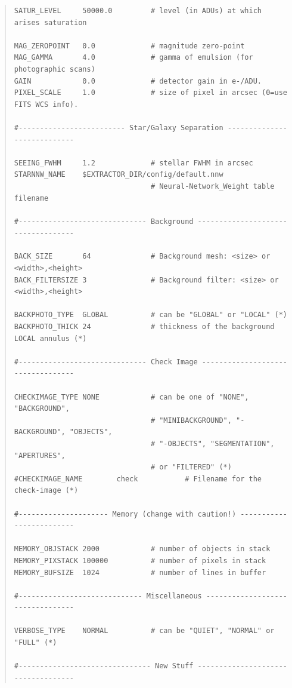 \documentclass[twoside,11pt]{article}
\renewcommand{\_}{\texttt{\symbol{95}}}
\begin{document}
\begin{quote}
\begin{verbatim}
SATUR_LEVEL     50000.0         # level (in ADUs) at which arises saturation

MAG_ZEROPOINT   0.0             # magnitude zero-point
MAG_GAMMA       4.0             # gamma of emulsion (for photographic scans)
GAIN            0.0             # detector gain in e-/ADU.
PIXEL_SCALE     1.0             # size of pixel in arcsec (0=use FITS WCS info).

#------------------------- Star/Galaxy Separation ----------------------------

SEEING_FWHM     1.2             # stellar FWHM in arcsec
STARNNW_NAME    $EXTRACTOR_DIR/config/default.nnw
                                # Neural-Network_Weight table filename

#------------------------------ Background -----------------------------------

BACK_SIZE       64              # Background mesh: <size> or <width>,<height>
BACK_FILTERSIZE 3               # Background filter: <size> or <width>,<height>

BACKPHOTO_TYPE  GLOBAL          # can be "GLOBAL" or "LOCAL" (*)
BACKPHOTO_THICK 24              # thickness of the background LOCAL annulus (*)

#------------------------------ Check Image ----------------------------------

CHECKIMAGE_TYPE NONE            # can be one of "NONE", "BACKGROUND",
                                # "MINIBACKGROUND", "-BACKGROUND", "OBJECTS",
                                # "-OBJECTS", "SEGMENTATION", "APERTURES",
                                # or "FILTERED" (*)
#CHECKIMAGE_NAME        check           # Filename for the check-image (*)

#--------------------- Memory (change with caution!) -------------------------

MEMORY_OBJSTACK 2000            # number of objects in stack
MEMORY_PIXSTACK 100000          # number of pixels in stack
MEMORY_BUFSIZE  1024            # number of lines in buffer

#----------------------------- Miscellaneous ---------------------------------

VERBOSE_TYPE    NORMAL          # can be "QUIET", "NORMAL" or "FULL" (*)

#------------------------------- New Stuff -----------------------------------
\end{verbatim}\end{quote}
\normalsize

\end{document}
